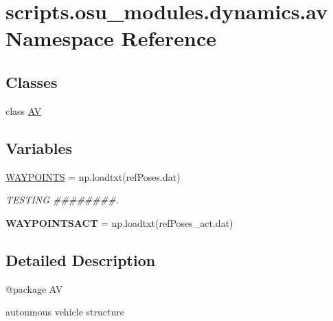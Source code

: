 \hypertarget{namespacescripts_1_1osu__modules_1_1dynamics_1_1av}{}\section{scripts.\+osu\+\_\+modules.\+dynamics.\+av Namespace Reference}
\label{namespacescripts_1_1osu__modules_1_1dynamics_1_1av}
\subsection*{Classes}
\begin{DoxyCompactItemize}
\item 
class \hyperlink{classscripts_1_1osu__modules_1_1dynamics_1_1av_1_1AV}{AV}
\end{DoxyCompactItemize}
\subsection*{Variables}
\begin{DoxyCompactItemize}
\item 
\mbox{\label{namespacescripts_1_1osu__modules_1_1dynamics_1_1av_ad4c875f15584519136d28c3975398858}} 
\hyperlink{namespacescripts_1_1osu__modules_1_1dynamics_1_1av_ad4c875f15584519136d28c3975398858}{W\+A\+Y\+P\+O\+I\+N\+TS} = np.\+loadtxt(\textquotesingle{}ref\+Poses.\+dat\textquotesingle{})
\begin{DoxyCompactList}\small\item\em T\+E\+S\+T\+I\+NG \#\#\#\#\#\#\#\#. \end{DoxyCompactList}\item 
\mbox{\label{namespacescripts_1_1osu__modules_1_1dynamics_1_1av_ad83d704da0c3db5eb2188cd338b67c5c}} 
{\bfseries W\+A\+Y\+P\+O\+I\+N\+T\+S\+A\+CT} = np.\+loadtxt(\textquotesingle{}ref\+Poses\+\_\+act.\+dat\textquotesingle{})
\end{DoxyCompactItemize}


\subsection{Detailed Description}
\begin{DoxyVerb}@package AV

autonmous vehicle structure
\end{DoxyVerb}
 